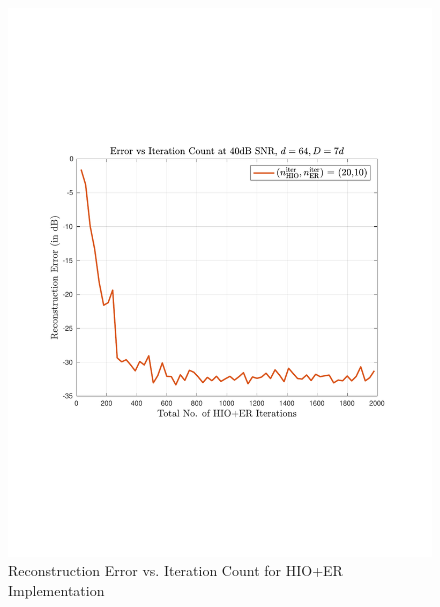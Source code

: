 \begin{figure}[H]
    \includegraphics[clip=true, trim = 0.75in 2.75in 1in 2.75in,scale=0.45]{pics/err_iteration_count}
    \caption{Reconstruction Error vs. Iteration Count for HIO+ER Implementation}
    \label{fig:iter_HIOER}
\end{figure}



